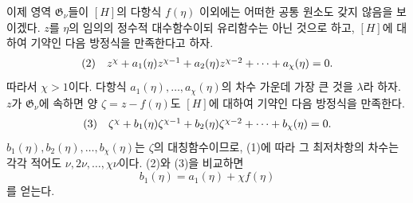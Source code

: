 
이제 영역 $\mathfrak G_\nu$들이 $[H]$의 다항식 $f(\eta)$ 이외에는 어떠한 공통 원소도 갖지 않음을 보이겠다. $z$를 $\eta$의 임의의 정수적 대수함수이되 유리함수는 아닌 것으로 하고, $[H]$에 대하여 기약인 다음 방정식을 만족한다고 하자.
\[
\begin{array}{@{}l@{\quad}c@{}}
(2)& z^\chi+a_1(\eta)z^{\chi-1}+a_2(\eta)z^{\chi-2}+\cdots+a_\chi(\eta)=0.
\end{array}
\]
따라서 $\chi>1$이다. 다항식 $a_1(\eta),\ldots,a_\chi(\eta)$의 차수 가운데 가장 큰 것을 $\lambda$라 하자. $z$가 $\mathfrak G_\nu$에 속하면 양 $\zeta=z-f(\eta)$도 $[H]$에 대하여 기약인 다음 방정식을 만족한다.
\[
\begin{array}{@{}l@{\quad}c@{}}
(3)& \zeta^\chi+b_1(\eta)\zeta^{\chi-1}+b_2(\eta)\zeta^{\chi-2}+\cdots+b_\chi(\eta)=0.
\end{array}
\]
$b_1(\eta),b_2(\eta),\ldots,b_\chi(\eta)$는 $\zeta$의 대칭함수이므로, (1)에 따라 그 최저차항의 차수는 각각 적어도 $\nu,2\nu,\ldots,\chi\nu$이다. (2)와 (3)을 비교하면
\[
 b_1(\eta)=a_1(\eta)+\chi f(\eta)
\]
를 얻는다.
